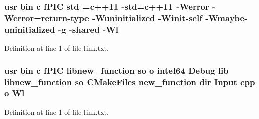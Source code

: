 \subsubsection[{\texorpdfstring{std}{std}}]{\setlength{\rightskip}{0pt plus 5cm}usr bin {\bf c} f\+P\+IC std ={\bf c}++11 -\/std={\bf c}++11 -\/Werror -\/Werror=return-\/type -\/Wuninitialized -\/Winit-\/self -\/Wmaybe-\/uninitialized -\/g -\/shared -\/{\bf Wl}}\hypertarget{common_2new__functions_2CMakeFiles_2new__function_8dir_2link_8txt_a5f87c8f8e33670f7c8c5221b6be1bcc4}{}\label{common_2new__functions_2CMakeFiles_2new__function_8dir_2link_8txt_a5f87c8f8e33670f7c8c5221b6be1bcc4}


Definition at line 1 of file link.\+txt.

\subsubsection[{\texorpdfstring{Wl}{Wl}}]{\setlength{\rightskip}{0pt plus 5cm}usr bin {\bf c} f\+P\+IC libnew\+\_\+function {\bf so} o intel64 Debug lib libnew\+\_\+function {\bf so} C\+Make\+Files new\+\_\+function dir Input cpp o Wl}\hypertarget{common_2new__functions_2CMakeFiles_2new__function_8dir_2link_8txt_ae5e6c203d8e387cca9f4160d4baf5c0a}{}\label{common_2new__functions_2CMakeFiles_2new__function_8dir_2link_8txt_ae5e6c203d8e387cca9f4160d4baf5c0a}


Definition at line 1 of file link.\+txt.

